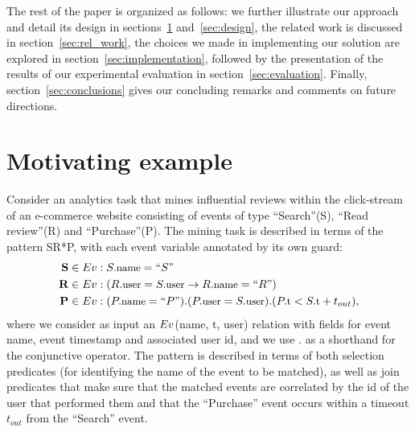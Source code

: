 The rest of the paper is organized as follows: 
we further illustrate our approach and detail its design in 
sections~\ref{sec:mot_example} and~\ref{sec:design},
the related work is discussed in section~\ref{sec:rel_work},  
the choices we made in implementing our solution are explored in 
section~\ref{sec:implementation}, followed by the presentation of the results 
of our experimental evaluation in section~\ref{sec:evaluation}. 
Finally, section~\ref{sec:conclusions} gives our concluding remarks and 
comments on future directions.   











\section{Motivating example}
\label{sec:mot_example}

Consider an analytics task that mines influential reviews
within the click-stream of an e-commerce website consisting of events of type
``Search''(S), ``Read review''(R) and ``Purchase''(P).
The mining task is described in terms of the pattern SR*P, with each event 
variable annotated by its own guard:
\begin{align*}
\text{{\bf S}} \in \Ev&: \facc{S}{name} = ``S"
\\
\text{{\bf R}} \in \Ev&: (\facc{R}{user} = \facc{S}{user} \rightarrow
\facc{R}{name} = ``R")
\\
\text{{\bf P}} \in \Ev&: (\facc{P}{name} = ``P") . 
(\facc{P}{user} = \facc{S}{user}) . 
(\facc{P}{t} < \facc{S}{t} + t_{out}),
\end{align*}
where we consider as input an $Ev$(name, t, user) relation with fields for 
event name, event timestamp and associated user id, and we use $.$ as a 
shorthand for the conjunctive operator. 
The pattern is described in terms of both selection predicates (for identifying 
the name of the event to be matched), as well as join predicates that make sure 
that the matched events are correlated by the id of the user that performed 
them and that the ``Purchase'' event occurs within a timeout $t_{out}$ from the 
``Search'' event. 

